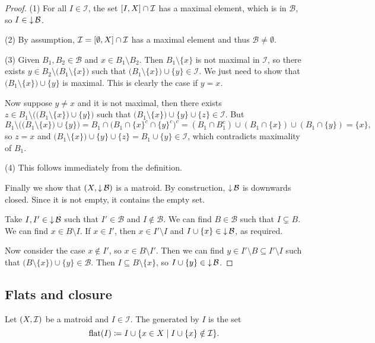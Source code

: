 \begin{proof}
(1) For all $I\in \mathcal{I}$, the set $\interval{I, X}\cap \mathcal{I}$ has a maximal element, which is in $\mathcal{B}$, so $I\in \operatorname{\downarrow} \mathcal{B}$.

(2) By assumption, $\mathcal{I} = \interval{\emptyset, X}\cap \mathcal{I}$ has a maximal element and thus $\mathcal{B}\neq \emptyset$.

(3) Given $B_1, B_2\in \mathcal{B}$ and $x\in B_1\setminus B_2$. Then $B_1\setminus \{x\}$ is not maximal in $\mathcal{I}$, so there exists $y\in B_2\setminus\big(B_1\setminus\{x\}\big)$ such that $\big(B_1\setminus\{x\}\big)\cup \{y\}\in \mathcal{I}$. We just need to show that $\big(B_1\setminus\{x\}\big)\cup \{y\}$ is maximal. This is clearly the case if $y = x$.

Now suppose $y\neq x$ and it is not maximal, then there exists $z\in B_1 \setminus \Big(\big(B_1\setminus\{x\}\big)\cup \{y\}\Big)$ such that $\big(B_1\setminus\{x\}\big)\cup \{y\}\cup\{z\}\in \mathcal{I}$. But
\[ B_1 \setminus \Big(\big(B_1\setminus\{x\}\big)\cup \{y\}\Big) = B_1\cap \big(B_1\cap\{x\}^c\cap \{y\}^c\big)^c = (B_1\cap B_1^c)\cup (B_1\cap \{x\}) \cup (B_1\cap \{y\}) = \{x\}, \]
so $z = x$ and $\big(B_1\setminus\{x\}\big)\cup \{y\}\cup\{z\} = B_1\cup\{y\} \in \mathcal{I}$, which contradicts maximality of $B_1$.

(4) This follows immediately from the definition.

Finally we show that $\left( X,\operatorname{\downarrow} \mathcal{B} \right)$ is a matroid. By construction, $\operatorname{\downarrow} \mathcal{B}$ is downwards closed. Since it is not empty, it contains the empty set.

Take $I,I'\in \operatorname{\downarrow} \mathcal{B}$ such that $I'\in \mathcal{B}$ and $I\notin \mathcal{B}$. We can find $B\in \mathcal{B}$ such that $I\subsetneq B$. We can find $x\in B\setminus I$. If $x\in I'$, then $x\in I'\setminus I$ and $I\cup\{x\}\in \operatorname{\downarrow} \mathcal{B}$, as required.

Now consider the case $x\notin I'$, so $x\in B\setminus I'$. Then we can find $y\in I'\setminus B \subseteq I'\setminus I$ such that $\big(B\setminus\{x\}\big)\cup \{y\}\in \mathcal{B}$. Then $I\subseteq B\setminus \{x\}$, so $I\cup \{y\} \in \operatorname{\downarrow} \mathcal{B}$.
\end{proof}

\subsection{Flats and closure}
\begin{definition}
Let $\left( X,\mathcal{I} \right)$ be a matroid and $I\in \mathcal{I}$. The  generated by $I$ is the set
\[ \mflat(I) \defeq I\cup \setbuilder{x\in X}{I\cup \{x\} \notin \mathcal{I}}. \]
\end{definition}

